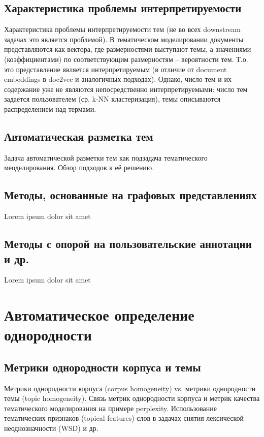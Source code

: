 \section{Характеристика проблемы интерпретируемости}

Характеристика проблемы интерпретируемости тем (не во всех downstream задачах это является проблемой). В тематическом моделировании документы представляются как вектора, где размерностями выступают темы, а значениями (коэффициентами) по соответствующим размерностям -- вероятности тем. Т.о. это представление является интерпретируемым (в отличие от document embeddings в doc2vec и аналогичных подходах). Однако, число тем и их содержание уже не являются непосредственно интерпретируемыми: число тем задается пользователем (ср. k-NN кластеризация), темы описываются распределением над термами. 

\section{Автоматическая разметка тем}

Задача автоматической разметки тем как подзадача тематического меоделирования. Обзор подходов к её решению.

\section{Методы, основанные на графовых представлениях}

Lorem ipsum dolor sit amet

\section{Методы с опорой на пользовательские аннотации и др.}

Lorem ipsum dolor sit amet



\chapter{Автоматическое определение однородности}

\section{Метрики однородности корпуса и темы}

Метрики однородности корпуса (corpus homogeneity) vs. метрики однородности темы (topic homogeneity). Связь метрик однородности корпуса и метрик качества тематического моделирования на примере perplexity. Использование тематических признаков (topical features) слов в задачах снятия лексической неоднозначности (WSD) и др.

